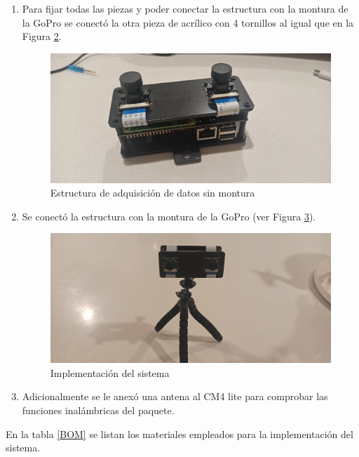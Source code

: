 \begin{enumerate}
\begin{figure}[H]
        \label{module_installed}
    \end{figure}
    \item Para fijar todas las piezas y poder conectar la estructura con la montura de la GoPro se conectó la otra pieza de acrílico con 4 tornillos al igual que en la Figura \ref{two_acrilics}.
    \begin{figure}[H]
        \centering
        \includegraphics[scale=0.05]{Recursos/two_pastic_installed.jpg}
        \caption{Estructura de adquisición de datos sin montura}
        \label{two_acrilics}
    \end{figure}
    \item Se conectó la estructura con la montura de la GoPro (ver Figura \ref{implemented_stereo_pi}).
    \begin{figure}[H]
        \centering
        \includegraphics[scale=0.05]{Recursos/implemented_stereopiv2.jpg}
        \caption{Implementación del sistema}
        \label{implemented_stereo_pi}
    \end{figure}
    \item Adicionalmente se le anexó una antena al CM4 lite para comprobar las funciones inalámbricas del paquete.
\end{enumerate}
En la tabla \ref{BOM} se listan los materiales empleados para la implementación del sistema.
